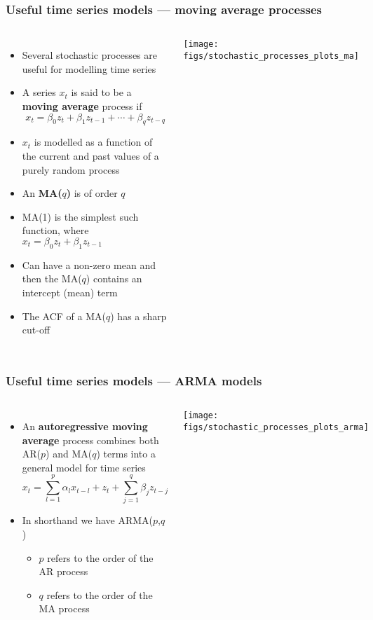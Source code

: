 \documentclass{beamer}
\begin{document}
\begin{frame}
    \frametitle{Useful time series models --- moving average processes}
    \small
    \begin{columns}
    \column{7cm}
        \begin{itemize}
            \item Several stochastic processes are useful for modelling time series
            \item A series $x_t$ is said to be a \textbf{moving average} process if
            $$x_t = \beta_0 z_t + \beta_1 z_{t-1} + \cdots + \beta_q z_{t-q}$$
            \item $x_t$ is modelled as a function of the current and past values of a purely random process
            \item An \textbf{MA($q$)} is of order $q$
            \item MA(1) is the simplest such function, where $x_t = \beta_0 z_t + \beta_1 z_{t-1}$
            \item Can have a non-zero mean and then the MA($q$) contains an intercept (mean) term
            \item The ACF of a MA($q$) has a sharp cut-off
        \end{itemize}
    \column{5cm}
    \texttt{[image: figs/stochastic\_processes\_plots\_ma]}
    \end{columns}
    \normalsize
\end{frame}

\begin{frame}
    \frametitle{Useful time series models --- ARMA models}
    \small
    \begin{columns}
    \column{7cm}
        \begin{itemize}
            \item An \textbf{autoregressive moving average} process combines both AR($p$) and MA($q$) terms into a general model for time series
            $$x_t = \sum \limits_{l = 1}^p \alpha_l x_{t-l} + z_t + \sum \limits_{j = 1}^q \beta_j z_{t-j}$$
            \item In shorthand we have ARMA($p$,$q$)
            \begin{itemize}
                \item $p$ refers to the order of the AR process
                \item $q$ refers to the order of the MA process
            \end{itemize}
        \end{itemize}
    \column{5cm}
    \texttt{[image: figs/stochastic\_processes\_plots\_arma]}
    \end{columns}
    \normalsize
\end{frame}
\end{document}
